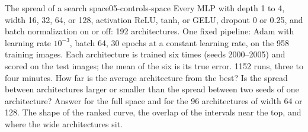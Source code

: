 \begin{refsection}
\begin{lab}{The spread of a search space}{05-controls-space}\label{lab:controls:space}
 Every MLP with depth 1 to 4, width 16, 32, 64, or 128, activation ReLU, tanh, or GELU, dropout 0 or 0.25, and batch normalization on or off: 192 architectures. One fixed pipeline: Adam with learning rate $10^{-3}$, batch 64, 30 epochs at a constant learning rate, on the 958 training images. Each architecture is trained six times (seeds 2000--2005) and scored on the test images; the mean of the six is its true error. 1152 runs, three to four minutes.
 How far is the average architecture from the best? Is the spread between architectures larger or smaller than the spread between two seeds of one architecture? Answer for the full space and for the 96 architectures of width 64 or 128.
 The shape of the ranked curve, the overlap of the intervals near the top, and where the wide architectures sit.
\end{lab}


\end{refsection}
